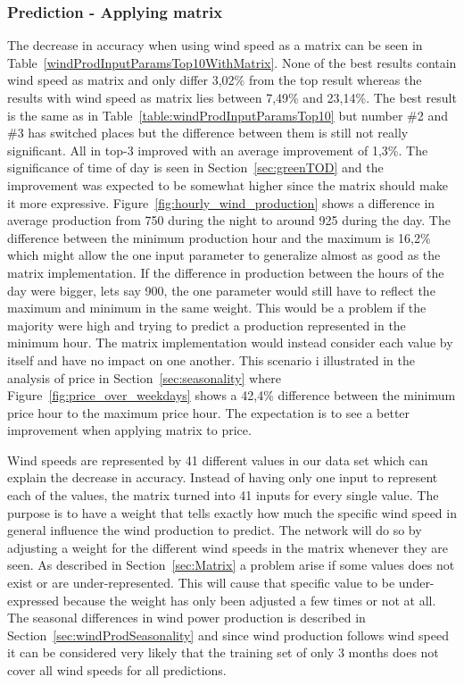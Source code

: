 \subsubsection{Prediction - Applying matrix}
The decrease in accuracy when using wind speed as a matrix can be seen in Table~\ref{windProdInputParamsTop10WithMatrix}. None of the best results contain wind speed as matrix and only differ 3,02\% from the top result whereas the results with wind speed as matrix lies between 7,49\% and 23,14\%. The best result is the same as in Table~\ref{table:windProdInputParamsTop10} but number \#2 and \#3 has switched places but the difference between them is still not really significant. All in top-3 improved with an average improvement of 1,3\%. The significance of time of day is seen in Section~\ref{sec:greenTOD} and the improvement was expected to be somewhat higher since the matrix should make it more expressive. Figure~\ref{fig:hourly_wind_production} shows a difference in average production from 750 during the night to around 925 during the day. The difference between the minimum production hour and the maximum is 16,2\% which might allow the one input parameter to generalize almost as good as the matrix implementation. If the difference in production between the hours of the day were bigger, lets say 900, the one parameter would still have to reflect the maximum and minimum in the same weight. This would be a problem if the majority were high and trying to predict a production represented in the minimum hour. The matrix implementation would instead consider each value by itself and have no impact on one another. This scenario i illustrated in the analysis of price in Section~\ref{sec:seasonality} where Figure~\ref{fig:price_over_weekdays} shows a 42,4\% difference between the minimum price hour to the maximum price hour. The expectation is to see a better improvement when applying matrix to price. 

Wind speeds are represented by 41 different values in our data set which can explain the decrease in accuracy. Instead of having only one input to represent each of the values, the matrix turned into 41 inputs for every single value. The purpose is to have a weight that tells exactly how much the specific wind speed in general influence the wind production to predict. The network will do so by adjusting a weight for the different wind speeds in the matrix whenever they are seen. As described in Section~\ref{sec:Matrix} a problem arise if some values does not exist or are under-represented. This will cause that specific value to be under-expressed because the weight has only been adjusted a few times or not at all. The seasonal differences in wind power production is described in Section~\ref{sec:windProdSeasonality} and since wind production follows wind speed it can be considered very likely that the training set of only 3 months does not cover all wind speeds for all predictions.

